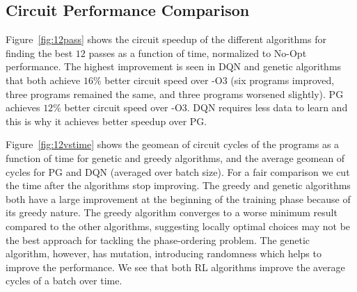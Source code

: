 
\vspace{-0.1cm}
\subsection{Circuit Performance Comparison}
\vspace{-0.1cm}

Figure~\ref{fig:12pass} shows the circuit speedup of the different algorithms for finding the best $12$ passes as a function of time, normalized to No-Opt performance. The highest improvement is seen in DQN and genetic algorithms that both achieve $16\%$ better circuit speed over -O3 (six programs improved, three programs remained the same, and three programs worsened slightly). PG achieves $12\%$ better circuit speed over -O3. DQN requires less data to learn and this is why it achieves better speedup over PG. 


Figure~\ref{fig:12vstime} shows the geomean of circuit cycles of the programs as a function of time for genetic and greedy algorithms, and the average geomean of cycles for PG and DQN (averaged over batch size). For a fair comparison we cut the time after the algorithms stop improving. 
The greedy and genetic algorithms both have a large improvement at the beginning of the training phase because of its greedy nature. 
The greedy algorithm converges to a worse minimum result compared to the other algorithms, suggesting locally optimal choices may not be the best approach for tackling the phase-ordering problem. 
The genetic algorithm, however, has mutation, introducing randomness which helps to improve the performance. 
We see that both RL algorithms improve the average cycles of a batch over time. 

